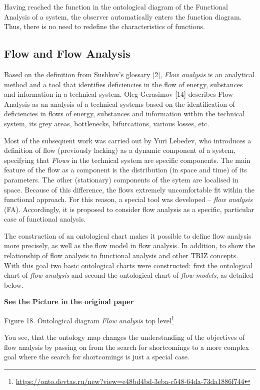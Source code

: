 \documentclass[11pt,a4paper]{article}
\newcommand{\addpicture}{\textbf{See the Picture in the original paper}\par}
\begin{document}
Having reached the function in the ontological diagram of the Functional
Analysis of a system, the observer automatically enters the function diagram.
Thus, there is no need to redefine the characteristics of functions.

\subsection{Flow and Flow Analysis}

Based on the definition from Sushkov's glossary [2], \emph{Flow analysis} is
an analytical method and a tool that identifies deficiencies in the flow of
energy, substances and information in a technical system. Oleg Gerasimov [14]
describes Flow Analysis as an analysis of a technical systems based on the
identification of deficiencies in flows of energy, substances and information
within the technical system, its grey areas, bottlenecks, bifurcations,
various losses, etc.

Most of the subsequent work was carried out by Yuri Lebedev, who introduces a
definition of flow (previously lacking) as a dynamic component of a system,
specifying that \emph{Flows} in the technical system are specific components.
The main feature of the flow as a component is the distribution (in space and
time) of its parameters. The other (stationary) components of the sytem are
localised in space. Because of this difference, the flows extremely
uncomfortable fit within the functional approach. For this reason, a special
tool was developed -- \emph{flow analysis} (FA). Accordingly, it is proposed
to consider flow analysis as a specific, particular case of functional
analysis.

The construction of an ontological chart makes it possible to define flow
analysis more precisely, as well as the flow model in flow analysis. In
addition, to show the relationship of flow analysis to functional analysis and
other TRIZ concepts. With this goal two basic ontological charts were
constructed: first the ontological chart of \emph{flow analysis} and 
second the ontological chart of \emph{flow models}, as detailed below.
\begin{center}
  \addpicture
  Figure 18. Ontological diagram \emph{Flow analysis} top
  level\footnote{\url{https://onto.devtas.ru/new?view=e48bd4bd-3eba-c548-64da-73da1886f744}} 
\end{center}
You see, that the ontology map changes the understanding of the objectives of
flow analysis by passing on from the search for shortcomings to a more complex
goal where the search for shortcomings is just a special case.
\end{document}
